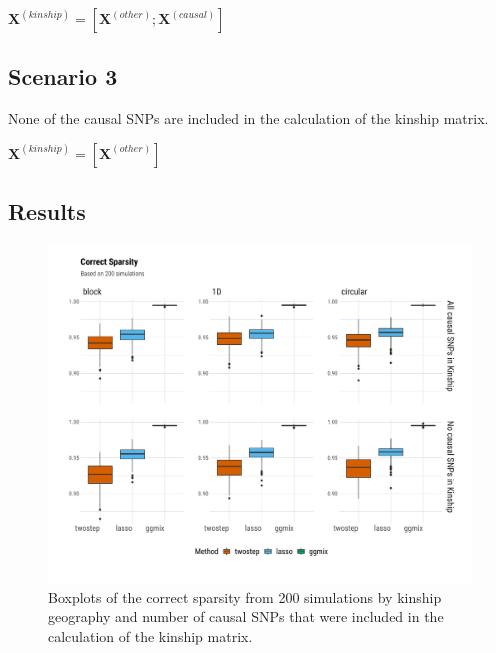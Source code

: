 \documentclass[12pt,letter]{article}\usepackage[]{graphicx}\usepackage[]{color}
\newenvironment{knitrout}{}{} %
\newcommand{\bX}{\textbf{X}}
\begin{document}
$\bX^{(kinship)} = \left[\bX^{(other)} ; \bX^{(causal)}\right]$


\subsection*{Scenario 3}
None of the causal SNPs are included in the calculation of the kinship matrix.

$\bX^{(kinship)} = \left[\bX^{(other)} \right]$

\subsection{Results}



\begin{knitrout}\scriptsize
{}\color{fgcolor}\begin{figure}[H]

{\centering \includegraphics[width=1\linewidth]{figure/plot-correct-sparsity-sim-1} 

}

\caption[Boxplots of the correct sparsity from 200 simulations by kinship geography and number of causal SNPs that were included in the calculation of the kinship matrix]{Boxplots of the correct sparsity from 200 simulations by kinship geography and number of causal SNPs that were included in the calculation of the kinship matrix.}\label{fig:plot-correct-sparsity-sim}
\end{figure}


\end{knitrout}
\end{document}
